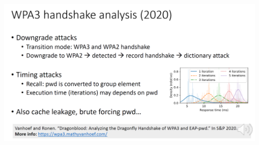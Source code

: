 \begin{minipage}{\linewidth}
    \centering      
    \includegraphics[width=\linewidth]{Figures/L9_wpa3_analysis.PNG}
\end{minipage}